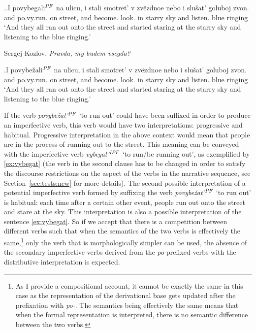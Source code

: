 \ex.\label{ex:povy}\ag.\label{ex:povybegat}I povybegali$^{\mathit{PF}}$ na ulicu, i stali smotret' v zv\"{e}zdnoe nebo i slu\v{s}at' goluboj zvon.\\
and po.vy.run. on street, and become. look. in starry sky and listen. blue ringing\\
\vspace{0.5em}
`And they all ran out onto the street and started staring at the starry sky and listening to the blue ringing.'
\begin{flushright}
\vspace{-0.5em}
Sergej Kozlov. \textit{Pravda, my budem vsegda?}
\end{flushright}
\bg.\label{ex:povybezhat}I povybe\v{z}ali$^{\mathit{PF}}$ na ulicu, i stali smotret' v zv\"{e}zdnoe nebo i slu\v{s}at' goluboj zvon.\\
and po.vy.run. on street, and become. look. in starry sky and listen. blue ringing\\
\vspace{0.5em}
`And they all ran out onto the street and started staring at the starry sky and listening to the blue ringing.'

If the verb \textit{povybe\v{z}at'$^{\mathit{PF}}$} `to run out' could have been suffixed in order to produce an imperfective verb, this verb would have two interpretations: progressive and habitual. Progressive interpretation in the above context would mean that people are in the process of running out to the street. This meaning can be conveyed with the imperfective verb \textit{vybegat'$^{\mathit{IPF}}$} `to run/be running out', as exemplified by \ref{ex:vybegat} (the verb in the second clause has to be changed in order to satisfy the discourse restrictions on the aspect of the verbs in the narrative sequence, see Section~\ref{sec:tests:new} for more details). The second possible interpretation of a potential imperfective verb formed by suffixing the verb \textit{povybe\v{z}at'$^{\mathit{PF}}$} `to run out' is habitual: each time after a certain other event, people run out onto the street and stare at the sky. This interpretation is also a possible interpretation of the sentence \ref{ex:vybegat}. So if we accept that there is a competition between different verbs such that when the semantics of the two verbs is effectively the same,\footnote{As I provide a compositional account, it cannot be exactly the same in this case as the representation of the derivational base gets updated after the prefixation with \textit{po-}. The semantics being effectively the same means that when the formal representation is interpreted, there is no semantic difference between the two verbs.} only the verb that is morphologically simpler can be used, the absence of the secondary imperfective verbs derived from the \textit{po-}prefixed verbs with the distributive interpretation is expected.

